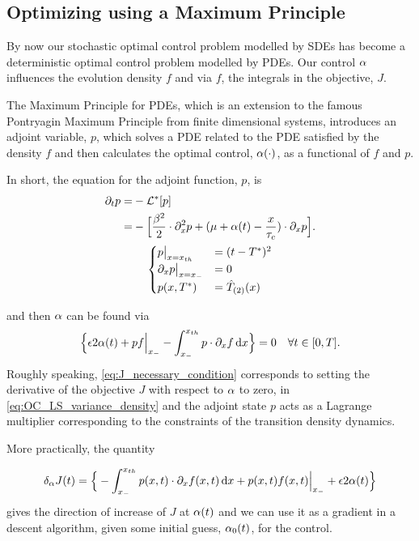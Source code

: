 \subsection{Optimizing using a Maximum Principle}
\label{sec:PDE_max_principle_for_pdf}
By now our stochastic optimal control problem modelled by SDEs
has become a deterministic optimal control problem modelled by PDEs. Our control
$\alpha$ influences the evolution density $f$ and via $f$, the integrals in the
objective, $J$.

The Maximum Principle for PDEs, which is an extension to the famous Pontryagin
Maximum Principle from finite dimensional systems, introduces an adjoint
variable, $p$, which solves a PDE related to the PDE satisfied by the density
$f$ and then calculates the optimal control, $\alpha(\cdot)$, as a functional of $f$
and $p$.

In short, the equation for the adjoint function, $p$, is
\begin{equation}
\begin{gathered}
\begin{aligned}
{\partial}_t p =& - { { \mathcal{L} }^* }[p]
\\
		=&
			- \Big[ \frac{\beta^2 }{2}\cdot {\partial}^2_x p +
			({\mu } + \alpha(t)- \frac{x}{\tau_c})  \cdot {\partial}_x p \Big].
\end{aligned}
\\
\begin{cases}
	p \big|_{x={ x_{th} }} &= (t-{ T^* })^2
	\\
	{\partial}_x p  \big|_{x={ x_{-} }} &= 0
	\\
	p(x,{ T^* }) &= { \hat{T}_{(2)} }(x)
\end{cases}
\label{eq:adjoint_pde_OU}
\end{gathered}
\end{equation}

and then $\alpha$ can be found via
\begin{equation}
\Big\{
 {\epsilon} 2 \alpha(t)
+ p f \Big|_{ x_{-} }
- \int _{ x_{-} }^{ x_{th} } p \cdot {\partial}_x f \, \mathrm{d} x
\Big\} = 0
\quad \forall t \in [0,T].
\label{eq:J_necessary_condition}
\end{equation}
Roughly speaking, \cref{eq:J_necessary_condition} corresponds to setting the
derivative of the objective $J$  with
respect to $\alpha$ to zero, in \cref{eq:OC_LS_variance_density} and the
adjoint state $p$ acts as a Lagrange multiplier corresponding to the constraints of
the transition density dynamics.

More practically, the quantity

\begin{equation}
\delta_\alpha J (t) =  \Big\{
- \int _{ x_{-} }^{ x_{th} } p(x,t) \cdot {\partial}_x f(x,t) \, \mathrm{d} x
+ p(x,t) f(x,t) \Big|_{ x_{-} }
+ {\epsilon}  2 \alpha(t)
\Big\}
\label{eq:hamiltonian_gradient}
\end{equation}
gives the direction of increase of $J$ at $\alpha(t)$
and we can use it as a gradient in a descent algorithm, given some initial
guess, $\alpha_0(t)$, for the control.

